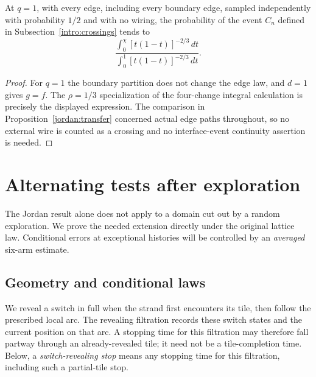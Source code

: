 \begin{corollary}\label{jordan:cardy}
At $q=1$, with every edge, including every boundary edge, sampled
independently with probability $1/2$ and with no wiring, the probability
of the event $C_n$ defined in Subsection~\ref{intro:crossings} tends to
\[
 \frac{\displaystyle\int_0^\chi [t(1-t)]^{-2/3}\,dt}
      {\displaystyle\int_0^1 [t(1-t)]^{-2/3}\,dt}.
\]
\end{corollary}
\begin{proof}
For $q=1$ the boundary partition does not change the edge law, and
$d=1$ gives $g=f$.  The $\rho=1/3$ specialization of the four-change
integral calculation is precisely the displayed expression.  The
comparison in Proposition~\ref{jordan:transfer} concerned actual edge
paths throughout, so no external wire is counted as a crossing and
no interface-event continuity assertion is needed.
\end{proof}

\section{Alternating tests after exploration}\label{sec:movingtests}

The Jordan result alone does not apply to a domain cut out by a random
exploration.  We prove the needed extension directly under the
original lattice law.  Conditional errors at exceptional histories
will be controlled by an \emph{averaged} six-arm estimate.

\subsection{Geometry and conditional laws}

We reveal a switch in full when the strand first encounters its tile,
then follow the prescribed local arc.  The revealing filtration records
these switch states and the current position on that arc.  A stopping
time for this filtration may therefore fall partway through an
already-revealed tile; it need not be a tile-completion time.  Below,
a \emph{switch-revealing stop} means any stopping time for this
filtration, including such a partial-tile stop.

